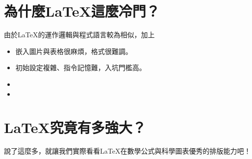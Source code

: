 \documentclass{../indiv}
\begin{document}
	\section{為什麼\LaTeX 這麼冷門？}
	由於\LaTeX 的運作邏輯與程式語言較為相似，加上
	\begin{itemize}
		\item 嵌入圖片與表格很麻煩，格式很難調。
		\item 初始設定複雜、指令記憶難，入坑門檻高。
		\item 
		\item 
	\end{itemize}
	
	
	\section{\LaTeX 究竟有多強大？}{%
		說了這麼多，就讓我們實際看看\LaTeX 在數學公式與科學圖表優秀的排版能力吧！
		
}
\end{document}
